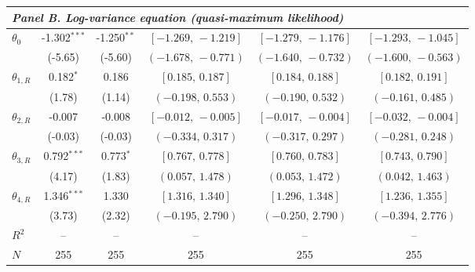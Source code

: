 \begin{table}[!htbp]
\begin{threeparttable}
\begin{tabular}{lccccc}
\midrule
\multicolumn{6}{l}{\textit{Panel B. Log-variance equation (quasi-maximum likelihood)}} \\
\midrule
$\theta_0$ & -1.302$^{***}$ & -1.250$^{**}$ & $[-1.269,\,-1.219]$ & $[-1.279,\,-1.176]$ & $[-1.293,\,-1.045]$ \\
 & (-5.65) & (-5.60) & $(-1.678,\,-0.771)$ & $(-1.640,\,-0.732)$ & $(-1.600,\,-0.563)$ \\
\midrule
$\theta_{1,R}$ & 0.182$^{*}$ & 0.186 & $[0.185,\,0.187]$ & $[0.184,\,0.188]$ & $[0.182,\,0.191]$ \\
 & (1.78) & (1.14) & $(-0.198,\,0.553)$ & $(-0.190,\,0.532)$ & $(-0.161,\,0.485)$ \\
$\theta_{2,R}$ & -0.007 & -0.008 & $[-0.012,\,-0.005]$ & $[-0.017,\,-0.004]$ & $[-0.032,\,-0.004]$ \\
 & (-0.03) & (-0.03) & $(-0.334,\,0.317)$ & $(-0.317,\,0.297)$ & $(-0.281,\,0.248)$ \\
$\theta_{3,R}$ & 0.792$^{***}$ & 0.773$^{*}$ & $[0.767,\,0.778]$ & $[0.760,\,0.783]$ & $[0.743,\,0.790]$ \\
 & (4.17) & (1.83) & $(0.057,\,1.478)$ & $(0.053,\,1.472)$ & $(0.042,\,1.463)$ \\
$\theta_{4,R}$ & 1.346$^{***}$ & 1.330 & $[1.316,\,1.340]$ & $[1.296,\,1.348]$ & $[1.236,\,1.355]$ \\
 & (3.73) & (2.32) & $(-0.195,\,2.790)$ & $(-0.250,\,2.790)$ & $(-0.394,\,2.776)$ \\
\midrule
$R^2$ & -- & -- & -- & -- & -- \\
$N$ & 255 & 255 & 255 & 255 & 255 \\
\bottomrule
\end{tabular}
\begin{tablenotes}[flushleft]
\scriptsize

\end{tablenotes}
\end{threeparttable}
\end{table}
